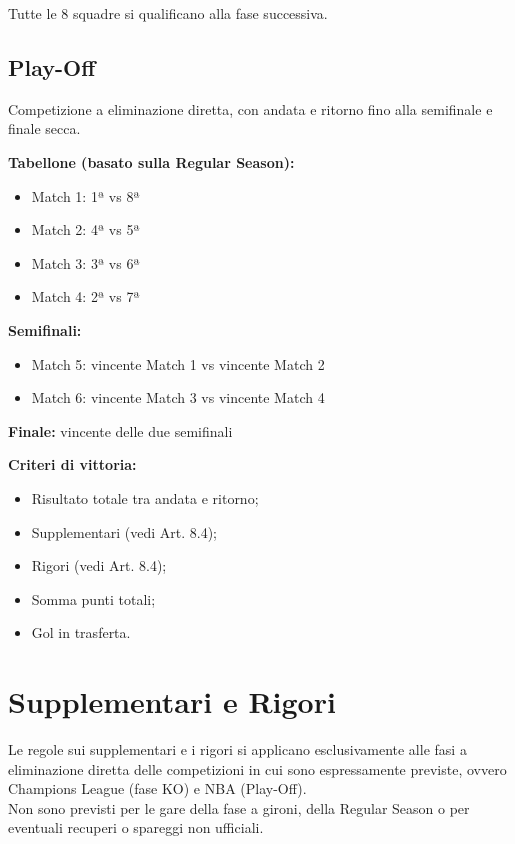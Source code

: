 \noindent
Tutte le 8 squadre si qualificano alla fase successiva.

\subsection{Play-Off}
\label{art:8.3.2}

Competizione a eliminazione diretta, con andata e ritorno fino alla semifinale e finale secca.

\noindent \textbf{Tabellone (basato sulla Regular Season):}
\begin{itemize}
  \item Match 1: 1ª vs 8ª
  \item Match 2: 4ª vs 5ª
  \item Match 3: 3ª vs 6ª
  \item Match 4: 2ª vs 7ª
\end{itemize}

\noindent
\textbf{Semifinali:}
\begin{itemize}
  \item Match 5: vincente Match 1 vs vincente Match 2
  \item Match 6: vincente Match 3 vs vincente Match 4
\end{itemize}
\textbf{Finale:} vincente delle due semifinali

\noindent \textbf{Criteri di vittoria:}
\begin{itemize}
  \item Risultato totale tra andata e ritorno;
  \item Supplementari (vedi Art. 8.4);
  \item Rigori (vedi Art. 8.4);
  \item Somma punti totali;
  \item Gol in trasferta.
\end{itemize}

\section{Supplementari e Rigori}
\label{art:8.4}

Le regole sui supplementari e i rigori si applicano esclusivamente alle fasi a eliminazione diretta delle competizioni in cui sono espressamente previste, ovvero Champions League (fase KO) e NBA (Play-Off).\\
Non sono previsti per le gare della fase a gironi, della Regular Season o per eventuali recuperi o spareggi non ufficiali.

